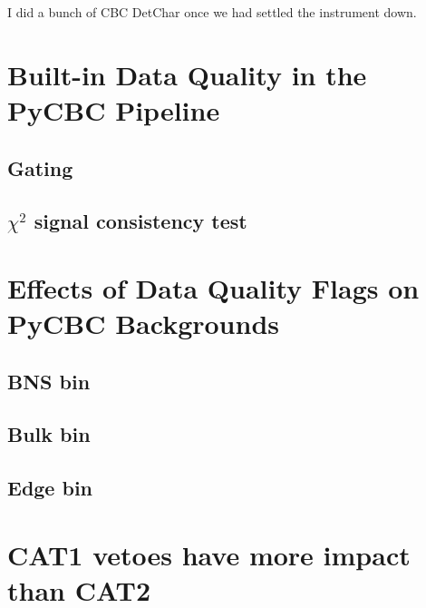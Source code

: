 I did a bunch of CBC DetChar once we had settled the instrument down.

\section{Built-in Data Quality in the PyCBC Pipeline}

\subsection{Gating}

\subsection{$\chi^{2}$ signal consistency test}

\section{Effects of Data Quality Flags on PyCBC Backgrounds}

\subsection{BNS bin}

\subsection{Bulk bin}

\subsection{Edge bin}

\section{CAT1 vetoes have more impact than CAT2}


